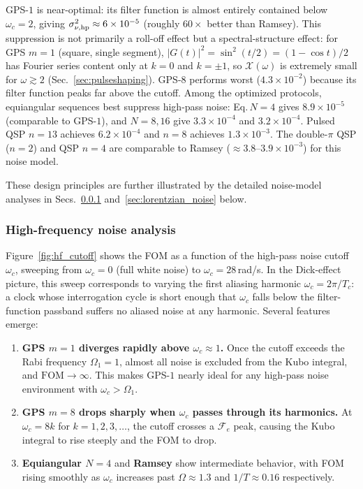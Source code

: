 \documentclass[aps,pra,twocolumn,superscriptaddress,longbibliography]{revtex4-2}
\begin{document}
\begin{enumerate}
        GPS-$1$ is near-optimal: its filter function is almost entirely contained
        below $\omega_c=2$, giving $\sigma^2_{\nu,\rm hp}\approx6\times10^{-5}$
        (roughly $60\times$ better than Ramsey).
        This suppression is not primarily a roll-off effect but a spectral-structure
        effect: for GPS $m=1$ (square, single segment), $|G(t)|^2=\sin^2(t/2)=
        (1-\cos t)/2$ has Fourier series content only at $k=0$ and $k=\pm 1$,
        so $\mathcal{X}(\omega)$ is extremely small for $\omega\gtrsim 2$
        (Sec.~\ref{sec:pulseshaping}).
        GPS-$8$ performs worst ($4.3\times10^{-2}$) because its filter function
        peaks far above the cutoff.
        Among the optimized protocols, equiangular sequences best suppress
        high-pass noise: Eq.\,$N{=}4$ gives $8.9\times10^{-5}$ (comparable to
        GPS-$1$), and $N{=}8,16$ give $3.3\times10^{-4}$ and $3.2\times10^{-4}$.
        Pulsed QSP $n{=}13$ achieves $6.2\times10^{-4}$ and $n{=}8$ achieves
        $1.3\times10^{-3}$.
        The double-$\pi$ QSP ($n{=}2$) and QSP $n{=}4$ are comparable to Ramsey
        ($\approx3.8$--$3.9\times10^{-3}$) for this noise model.
\end{enumerate}
These design principles are further illustrated by the detailed noise-model
analyses in Secs.~\ref{sec:hf_noise} and~\ref{sec:lorentzian_noise} below.

\subsubsection{High-frequency noise analysis}
\label{sec:hf_noise}

Figure~\ref{fig:hf_cutoff} shows the FOM as a function of the high-pass noise
cutoff $\omega_c$, sweeping from $\omega_c=0$ (full white noise) to
$\omega_c=28$\,rad/s.
In the Dick-effect picture, this sweep corresponds to varying the first aliasing
harmonic $\omega_c = 2\pi/T_c$: a clock whose interrogation cycle is short enough
that $\omega_c$ falls below the filter-function passband suffers no aliased noise
at any harmonic.
Several features emerge:
\begin{enumerate}
  \item \textbf{GPS $m=1$ diverges rapidly above $\omega_c\approx 1$.}
        Once the cutoff exceeds the Rabi frequency $\Omega_1=1$, almost all
        noise is excluded from the Kubo integral, and $\mathrm{FOM}\to\infty$.
        This makes GPS-$1$ nearly ideal for any high-pass noise environment
        with $\omega_c > \Omega_1$.
  \item \textbf{GPS $m=8$ drops sharply when $\omega_c$ passes through its
        harmonics.}
        At $\omega_c = 8k$ for $k=1,2,3,\ldots$, the cutoff crosses a
        $\mathcal{F}_e$ peak, causing the Kubo integral to rise steeply and
        the FOM to drop.
  \item \textbf{Equiangular $N=4$} and \textbf{Ramsey} show intermediate
        behavior, with FOM rising smoothly as $\omega_c$ increases past
        $\Omega\approx 1.3$ and $1/T\approx 0.16$ respectively.
\end{enumerate}
\end{document}
